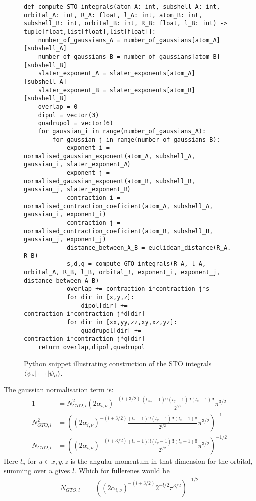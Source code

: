 \begin{figure}[H]
\begin{verbatim}
def compute_STO_integrals(atom_A: int, subshell_A: int, orbital_A: int, R_A: float, l_A: int, atom_B: int, subshell_B: int, orbital_B: int, R_B: float, l_B: int) -> tuple[float,list[float],list[float]]:
    number_of_gaussians_A = number_of_gaussians[atom_A][subshell_A]
    number_of_gaussians_B = number_of_gaussians[atom_B][subshell_B]
    slater_exponent_A = slater_exponents[atom_A][subshell_A]
    slater_exponent_B = slater_exponents[atom_B][subshell_B]
    overlap = 0
    dipol = vector(3)
    quadrupol = vector(6)
    for gaussian_i in range(number_of_gaussians_A):
        for gaussian_j in range(number_of_gaussians_B):
            exponent_i = normalised_gaussian_exponent(atom_A, subshell_A, gaussian_i, slater_exponent_A)
            exponent_j = normalised_gaussian_exponent(atom_B, subshell_B, gaussian_j, slater_exponent_B)
            contraction_i = normalised_contraction_coeficient(atom_A, subshell_A, gaussian_i, exponent_i)
            contraction_j = normalised_contraction_coeficient(atom_B, subshell_B, gaussian_j, exponent_j)
            distance_between_A_B = euclidean_distance(R_A, R_B)
            s,d,q = compute_GTO_integrals(R_A, l_A, orbital_A, R_B, l_B, orbital_B, exponent_i, exponent_j, distance_between_A_B)
            overlap += contraction_i*contraction_j*s
            for dir in [x,y,z]:
                dipol[dir] += contraction_i*contraction_j*d[dir]
            for dir in [xx,yy,zz,xy,xz,yz]:
                quadrupol[dir] += contraction_i*contraction_j*q[dir]
    return overlap,dipol,quadrupol
\end{verbatim}
    \caption{Python snippet illustrating construction of the STO integrals $\braket{\psi_\nu|\cdots|\psi_\mu}$.}
\end{figure}

The gaussian normalisation term\cite[eq. 5.55]{daudel} is:
\begin{align}
    1&=N_{GTO,l}^2(2\alpha_{i,\nu})^{-(l+3/2)}\frac{({l_A}_x-1)!!({l}_y-1)!!({l}_z-1)!!}{2^{l/2}}\pi^{3/2}\\
    N_{GTO,l}^2&=\left((2\alpha_{i,\nu})^{-(l+3/2)}\frac{({l}_x-1)!!({l}_y-1)!!({l}_z-1)!!}{2^{l/2}}\pi^{3/2}\right)^{-1}\\
    N_{GTO,l}&=\left((2\alpha_{i,\nu})^{-(l+3/2)}\frac{({l}_x-1)!!({l}_y-1)!!({l}_z-1)!!}{2^{l/2}}\pi^{3/2}\right)^{-1/2}
\end{align}
Here $l_u$ for $u\in x,y,z$ is the angular momentum in that dimension for the orbital, summing over $u$ gives $l$.
Which for fullerenes would be 
\begin{align}
    N_{GTO,l}&=\left((2\alpha_{i,\nu})^{-(l+3/2)}2^{-l/2}\pi^{3/2}\right)^{-1/2}
\end{align}

